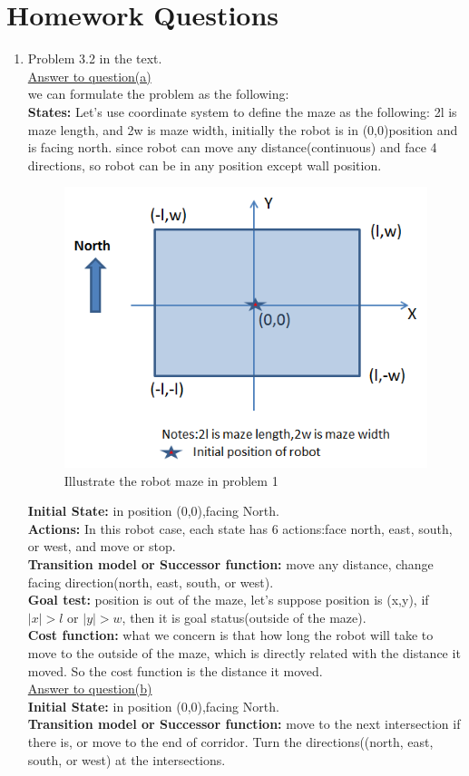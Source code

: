 \documentclass{article}
\begin{document}
\section*{Homework Questions}
\begin{enumerate}
\item Problem 3.2 in the text.\\
\underline{Answer to question(a)}\\
we can formulate the problem as the following:\\
\textbf{States:} Let's use coordinate system to define the maze as the following: 2l is maze length, and 2w is maze width, initially the robot is in (0,0)position and is facing north. since robot can move any distance(continuous) and face 4 directions, so robot can be in any position except wall position.\\
\begin{figure}[h]
\includegraphics[width=0.4\columnwidth]{mazep1}\centering %
\caption{Illustrate the robot maze in problem 1}
\end{figure}
\textbf{Initial State:} in position (0,0),facing North.\\
\textbf{Actions:} In this robot case, each state has 6 actions:face north, east, south, or west, and move or stop.\\
\textbf{Transition model or Successor function:} move any distance, change facing direction(north, east, south, or west).\\
\textbf{Goal test:} position is out of the maze, let's suppose position is (x,y), if $|x|>l$ or $|y|>w$, then it is goal status(outside of the maze).\\
\textbf{Cost function:} what we concern is that how long the robot will take to move to the outside of the maze, which is directly related with the distance it moved. So the cost function is the distance it moved.\\
\underline{Answer to question(b)}\\
\textbf{Initial State:} in position (0,0),facing North.\\
\textbf{Transition model or Successor function:} move to the next intersection if there is, or move to the end of corridor. Turn the directions((north, east, south, or west) at the intersections.\\

\end{enumerate}
\end{document}
